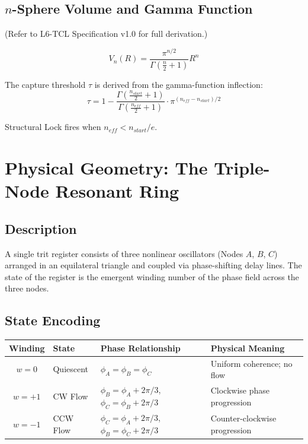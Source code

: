 \documentclass[11pt, a4paper]{article}
\begin{document}
\subsection{$n$-Sphere Volume and Gamma Function}

(Refer to L6-TCL Specification v1.0 for full derivation.)

\begin{equation}
  V_n(R) = \frac{\pi^{n/2}}{\Gamma\!\left(\frac{n}{2}+1\right)} R^n
\end{equation}

The capture threshold $\tau$ is derived from the gamma-function inflection:
\begin{equation}
  \tau = 1 - \frac{\Gamma\!\left(\frac{n_{start}}{2}+1\right)}
                  {\Gamma\!\left(\frac{n_{eff}}{2}+1\right)}
  \cdot \pi^{(n_{eff}-n_{start})/2}
\end{equation}

Structural Lock fires when $n_{eff} < n_{start}/e$.

\section{Physical Geometry: The Triple-Node Resonant Ring}

\subsection{Description}

A single trit register consists of three nonlinear oscillators (Nodes $A$,
$B$, $C$) arranged in an equilateral triangle and coupled via phase-shifting
delay lines. The state of the register is the emergent winding number of
the phase field across the three nodes.

\subsection{State Encoding}

\begin{center}
\begin{tabular}{@{}clll@{}}
\toprule
\textbf{Winding} & \textbf{State} & \textbf{Phase Relationship} & \textbf{Physical Meaning} \\
\midrule
$w = 0$  & Quiescent   & $\phi_A = \phi_B = \phi_C$ & Uniform coherence; no flow \\
$w = +1$ & CW Flow     & $\phi_B = \phi_A + 2\pi/3$, $\phi_C = \phi_B + 2\pi/3$ & Clockwise phase progression \\
$w = -1$ & CCW Flow    & $\phi_C = \phi_A + 2\pi/3$, $\phi_B = \phi_C + 2\pi/3$ & Counter-clockwise progression \\
\bottomrule
\end{tabular}
\end{center}
\end{document}
